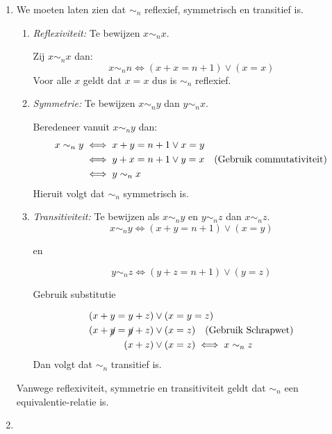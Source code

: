 \documentclass{article}
\begin{document}
\begin{enumerate}[label=\alph*)]
    \item
          We moeten laten zien dat $\sim_n$ reflexief, symmetrisch en transitief is.
          \begin{enumerate}[label=\arabic*.]
              \item \emph{Reflexiviteit:} Te bewijzen $x \sim_n x$.

                    Zij $x \sim_n x$ dan:
                    \[x \sim_n n \iff (x + x = n + 1) \vee (x = x)\]
                    Voor alle $x$ geldt dat $x = x$ dus is $\sim_n$ reflexief.
              \item \emph{Symmetrie:} Te bewijzen $x \sim_n y$ dan $y \sim_n x$.

                    Beredeneer vanuit $x \sim_n y$ dan:
                    \begin{align*}
                        x  \sim_n y & \iff x + y = n + 1 \vee x = y                                      \\
                                    & \iff y + x = n + 1 \vee y = x \quad (\text{Gebruik commutativiteit}) \\
                                    & \iff y \sim_n x
                    \end{align*}
                    Hieruit volgt dat $\sim_n$ symmetrisch is.
              \item \emph{Transitiviteit:}
                    Te bewijzen als $x \sim_n y$ en $y \sim_n z$ dan $x \sim_n z$.
                    \[x \sim_n y \iff (x + y = n + 1) \vee (x = y)\]
                    \begin{center}
                        en
                    \end{center}
                    \[y \sim_n z \iff (y + z = n + 1) \vee (y = z)\]
                    \begin{center}
                        Gebruik substitutie
                    \end{center}
                    \begin{align*}
                        (x + y = y + z)           & \vee (x = y = z)                            \\
                        (x + \cancel{y} = \cancel{y} + z) & \vee (x = z) \quad (\text{Gebruik Schrapwet}) \\
                        (x + z)                   & \vee (x = z) \iff x \sim_n z
                    \end{align*}
                    Dan volgt dat $\sim_n$ transitief is.
          \end{enumerate}
          Vanwege reflexiviteit, symmetrie en transitiviteit geldt dat $\sim_n$ een equivalentie-relatie is.
    \item


\end{enumerate}
\end{document}
